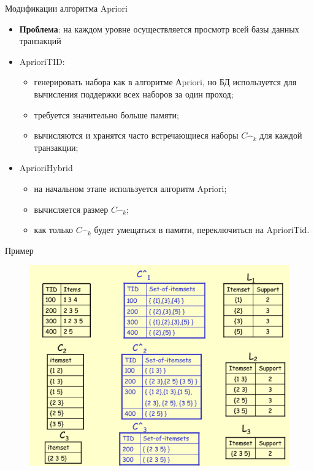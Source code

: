 \documentclass{beamer}
\begin{document}
\begin{frame}{Модификации алгоритма Apriori}
\begin{itemize}
\item \textbf{Проблема}: на каждом уровне осуществляется просмотр всей базы данных транзакций
\item AprioriTID: 
  \begin{itemize}
  \item генерировать набора как в алгоритме Аpriori, но БД используется для вычисления поддержки всех наборов за один проход;
  \item требуется значительно больше памяти;
  \item вычисляются и хранятся часто встречающиеся наборы $C\hat{\text{ }}_k$ для каждой транзакции;
  \end{itemize}
\item AprioriHybrid 
  \begin{itemize}
  \item на начальном этапе используется алгоритм Apriori;
  \item вычисляется размер $C\hat{\text{ }}_k$; 
  \item как только $C\hat{\text{ }}_k$ будет умещаться в памяти, переключиться на AprioriTid.
  \end{itemize}
\end{itemize}
\end{frame}

\begin{frame}{Пример}
\begin{figure}[h]
\centering
\includegraphics[scale=0.6]{images/lec08-pic20.png}
\end{figure}
\end{frame}
\end{document}
